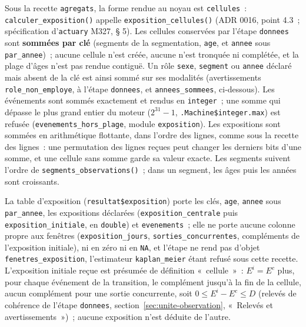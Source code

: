 \documentclass[a4paper,11pt]{article}
\newcommand{\code}[1]{\texttt{\small #1}}
\begin{document}
Sous la recette \code{agregats}, la forme rendue au noyau est
\code{cellules}~: \code{calculer\_exposition()} appelle
\code{exposition\_cellules()} (ADR 0016, point 4.3~; spécification
d'\code{actuary} M327, § 5). Les cellules conservées par l'étape
\code{donnees} sont \textbf{sommées par clé} (segments de la segmentation,
\code{age}, et \code{annee} sous \code{par\_annee})~; aucune cellule n'est
créée, aucune n'est tronquée ni complétée, et la plage d'âges n'est pas
rendue contiguë. Un rôle \code{sexe}, \code{segment} ou \code{annee}
déclaré mais absent de la clé est ainsi sommé sur ses modalités
(avertissements \code{role\_non\_employe}, à l'étape \code{donnees}, et
\code{annees\_sommees}, ci-dessous). Les événements sont sommés exactement
et rendus en \code{integer}~; une somme qui dépasse le plus grand entier du
moteur ($2^{31} - 1$, \code{.Machine\$integer.max}) est refusée
(\code{evenements\_hors\_plage}, module \code{exposition}). Les expositions
sont sommées en arithmétique flottante, dans l'ordre des lignes, comme sous
la recette des lignes~: une permutation des lignes reçues peut changer les
derniers bits d'une somme, et une cellule sans somme garde sa valeur
exacte. Les segments suivent l'ordre de \code{segments\_observations()}~;
dans un segment, les âges puis les années sont croissants.

\medskip
La table d'exposition (\code{resultat\$exposition}) porte les clés,
\code{age}, \code{annee} sous \code{par\_annee}, les expositions
déclarées (\code{exposition\_centrale} puis \code{exposition\_initiale},
en \code{double}) et \code{evenements}~; elle ne porte aucune colonne
propre aux fenêtres (\code{exposition\_jours},
\code{sorties\_concurrentes}, compléments de l'exposition initiale), ni en
zéro ni en \code{NA}, et l'étape ne rend pas d'objet
\code{fenetres\_exposition}, l'estimateur \code{kaplan\_meier} étant refusé
sous cette recette. L'exposition initiale reçue est présumée de définition
«~cellule~»~: $E^i = E^c$ plus, pour chaque événement de la transition, le
complément jusqu'à la fin de la cellule, aucun complément pour une sortie
concurrente, soit $0 \le E^i - E^c \le D$ (relevés de cohérence de
l'étape \code{donnees}, section~\ref{sec:unite-observation}, «~Relevés et
avertissements~»)~; aucune exposition n'est déduite de l'autre.
\end{document}
